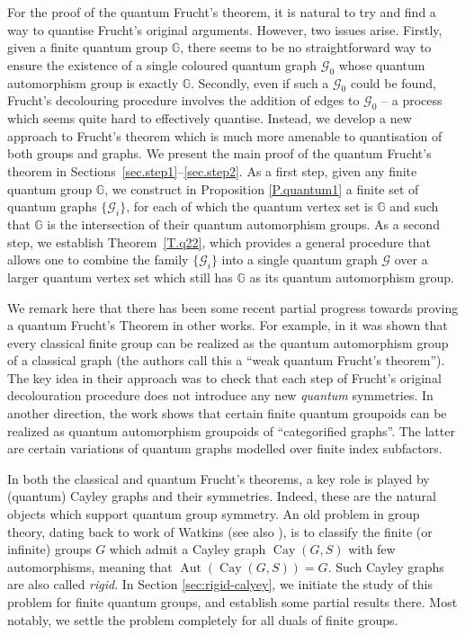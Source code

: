 \documentclass[12pt]{amsart}
\theoremstyle{definition}
\theoremstyle{definition}
\theoremstyle{definition}
\theoremstyle{definition}
\DeclareMathOperator{\Aut}{Aut}
\DeclareMathOperator{\Cay}{Cay}
\newcommand{\G}{\mathbb{G}}
\newcommand{\Gr}{\mathcal{G}}
\numberwithin{equation}{section}
\begin{document}
For the proof of the quantum Frucht's theorem, it is natural to try and find a way to quantise Frucht's original arguments.  However, two issues arise. Firstly, given a finite quantum group $\G$, there seems to be no straightforward way to ensure the existence of a single coloured quantum graph $\Gr_0$ whose quantum automorphism group is exactly $\G$.  Secondly, even if such a $\Gr_0$ could be found, Frucht's decolouring procedure involves the addition of edges to $\Gr_0$ -- a process which seems quite hard to effectively quantise. Instead, we develop a new approach to Frucht's theorem which is much more amenable to quantisation of both groups and graphs.  We present the main proof of the quantum Frucht's theorem in Sections~\ref{sec.step1}--\ref{sec.step2}. As a first step, given any finite quantum group $\G$, we construct in Proposition \ref{P.quantum1} a finite set of quantum graphs $\{\Gr_i\}$, for each of which the quantum vertex set is $\G$ and such that $\G$ is the intersection of their quantum automorphism groups. As a second step, we establish Theorem~\ref{T.q22}, which provides a general procedure that allows one  to combine the family $\{\Gr_i\}$ into a single quantum graph $\Gr$ over a 
larger quantum vertex set which still has $\G$ as its quantum automorphism group. 

We remark here that there has been some recent partial progress towards proving a quantum Frucht's Theorem in other works. 
 For example, in \cite{DBRS24} it was shown that every classical finite group can be realized as the quantum automorphism group of a classical graph (the authors call this a ``weak quantum Frucht's theorem''). 
 The key idea in their approach was to check that each step of Frucht's original decolouration procedure does not introduce any new {\it quantum} symmetries.  In another direction, the work \cite{BH24} shows that certain finite quantum groupoids can be realized as quantum automorphism groupoids of ``categorified graphs''. The latter are certain variations of quantum graphs modelled over finite index subfactors.

In both the classical and quantum Frucht's theorems, a key role is played by (quantum) Cayley graphs and their symmetries.  Indeed, these are the natural objects which support quantum group symmetry.  An old problem in group theory, dating back to work of Watkins \cite{Wat76} (see also \cite{LdlS}), is to classify the finite (or infinite) groups $G$ which admit a Cayley graph $\Cay(G,S)$ with few automorphisms, meaning that $\Aut(\Cay(G,S)) = G$. Such Cayley graphs are also called {\it rigid}.  In Section \ref{sec:rigid-calyey}, we initiate the study of this problem for finite quantum groups, and establish some partial results there.  Most notably, we settle the problem completely for all duals of finite groups. 
\end{document}
